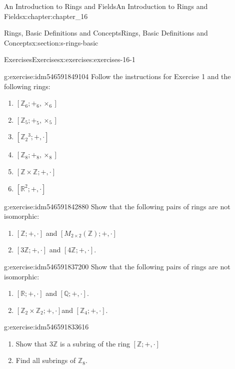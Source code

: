 \documentclass[oneside,10pt,]{book}
\numberwithin{equation}{section}
\begin{document}
\begin{chapterptx}{An Introduction to Rings and Fields}{}{An Introduction to Rings and Fields}{}{}{x:chapter:chapter_16}
\begin{sectionptx}{Rings, Basic Definitions and Concepts}{}{Rings, Basic Definitions and Concepts}{}{}{x:section:s-rings-basic}
\begin{exercises-subsection}{Exercises}{}{Exercises}{}{}{x:exercises:exercises-16-1}
\begin{divisionexercise}{2}{}{}{g:exercise:idm546591849104}%
Follow the instructions for Exercise 1 and the following rings:%
\begin{multicols}{2}
\begin{enumerate}[label=(\alph*)]
\item{}\(\left[\mathbb{Z}_6;+_6,\times_6\right]\)%
\item{}\(\left[\mathbb{Z}_5;+_5,\times_5\right]\)%
\item{}\(\left[\mathbb{Z}_2{}^3;+,\cdot \right]\)%
\item{}\(\left[\mathbb{Z}_8; +_8 , \times_8 \right]\)%
\item{}\([\mathbb{Z} \times \mathbb{Z}; +, \cdot ]\)%
\item{}\(\left[\mathbb{R}^2; +, \cdot \right]\)%
\end{enumerate}
\end{multicols}
%
\end{divisionexercise}%
\begin{divisionexercise}{3}{}{}{g:exercise:idm546591842880}%
Show that the following pairs of rings are not isomorphic:%
\begin{enumerate}[label=(\alph*)]
\item{}\([\mathbb{Z};+,\cdot ]\) and \(\left[M_{2\times 2}(\mathbb{Z});+,\cdot \right]\)%
\item{}\([3\mathbb{Z};+, \cdot ]\) and \([4\mathbb{Z};+, \cdot ]\).%
\end{enumerate}
%
\end{divisionexercise}%
\begin{divisionexercise}{4}{}{}{g:exercise:idm546591837200}%
Show that the following pairs of rings are not isomorphic:%
\begin{enumerate}[label=(\alph*)]
\item{}\([\mathbb{R}; +, \cdot ]\) and \([\mathbb{Q};+, \cdot ]\).%
\item{}\(\left[\mathbb{Z}_2 \times  \mathbb{Z}_2; +,\cdot \right]\)and \(\left[\mathbb{Z}_4; +, \cdot \right]\).%
\end{enumerate}
%
\end{divisionexercise}%
\begin{divisionexercise}{5}{}{}{g:exercise:idm546591833616}%
%
\begin{enumerate}[label=(\alph*)]
\item{}Show that \(3\mathbb{Z}\) is a subring of the ring \([\mathbb{Z}; +, \cdot]\)%
\item{}Find all subrings of \(\mathbb{Z}_8\).%

\end{enumerate}
\end{divisionexercise}
\end{exercises-subsection}
\end{sectionptx}
\end{chapterptx}
\end{document}
